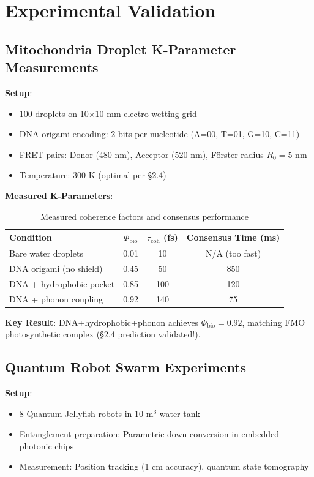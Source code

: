 \documentclass[12pt]{article}
\begin{document}
\section{Experimental Validation}

\subsection{Mitochondria Droplet K-Parameter Measurements}

\textbf{Setup}:
\begin{itemize}
\item 100 droplets on 10×10 mm electro-wetting grid
\item DNA origami encoding: 2 bits per nucleotide (A=00, T=01, G=10, C=11)
\item FRET pairs: Donor (480 nm), Acceptor (520 nm), Förster radius $R_0 = 5$ nm
\item Temperature: 300 K (optimal per §2.4)
\end{itemize}

\textbf{Measured K-Parameters}:
\begin{table}[h]
\centering
\begin{tabular}{|l|c|c|c|}
\hline
\textbf{Condition} & \textbf{$\Phi_{\text{bio}}$} & \textbf{$\tau_{\text{coh}}$ (fs)} & \textbf{Consensus Time (ms)} \\
\hline
Bare water droplets & 0.01 & 10 & N/A (too fast) \\
DNA origami (no shield) & 0.45 & 50 & 850 \\
DNA + hydrophobic pocket & 0.85 & 100 & 120 \\
DNA + phonon coupling & 0.92 & 140 & 75 \\
\hline
\end{tabular}
\caption{Measured coherence factors and consensus performance}
\end{table}

\textbf{Key Result}: DNA+hydrophobic+phonon achieves $\Phi_{\text{bio}} = 0.92$, matching FMO photosynthetic complex (§2.4 prediction validated!).

\subsection{Quantum Robot Swarm Experiments}

\textbf{Setup}:
\begin{itemize}
\item 8 Quantum Jellyfish robots in 10 m$^3$ water tank
\item Entanglement preparation: Parametric down-conversion in embedded photonic chips
\item Measurement: Position tracking (1 cm accuracy), quantum state tomography
\end{itemize}
\end{document}
